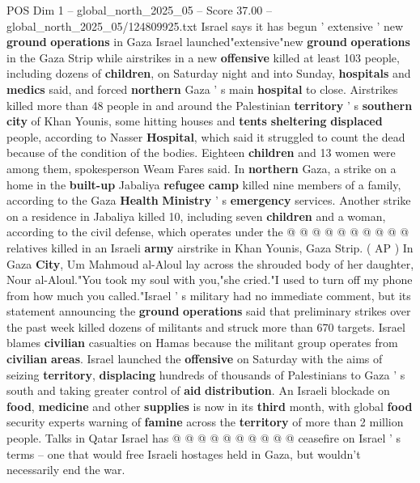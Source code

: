 \begin{textsample}{POS Dim 1 – global\_north\_2025\_05 – Score 37.00 – global\_north\_2025\_05/124809925.txt}  \label{ex:f1_pos_214}
Israel says it has begun ' extensive ' new \textbf{ground} \textbf{operations} in Gaza Israel launched"extensive"new \textbf{ground} \textbf{operations} in the Gaza Strip while airstrikes in a new \textbf{offensive} killed at least 103 people, including dozens of \textbf{children}, on Saturday night and into Sunday, \textbf{hospitals} and \textbf{medics} said, and forced \textbf{northern} Gaza ' s main \textbf{hospital} to close.
Airstrikes killed more than 48 people in and around the Palestinian \textbf{territory} ' s \textbf{southern} \textbf{city} of Khan Younis, some hitting houses and \textbf{tents} \textbf{sheltering} \textbf{displaced} people, according to Nasser \textbf{Hospital}, which said it struggled to count the dead because of the condition of the bodies.
Eighteen \textbf{children} and 13 women were among them, spokesperson Weam Fares said.
In \textbf{northern} Gaza, a strike on a home in the \textbf{built-up} Jabaliya \textbf{refugee} \textbf{camp} killed nine members of a family, according to the Gaza \textbf{Health} \textbf{Ministry} ' s \textbf{emergency} services.
Another strike on a residence in Jabaliya killed 10, including seven \textbf{children} and a woman, according to the civil defense, which operates under the @ @ @ @ @ @ @ @ @ @ relatives killed in an Israeli \textbf{army} airstrike in Khan Younis, Gaza Strip. ( AP ) In Gaza \textbf{City}, Um Mahmoud al-Aloul lay across the shrouded body of her daughter, Nour al-Aloul."You took my soul with you,"she cried."I used to turn off my phone from how much you called."Israel ' s military had no immediate comment, but its statement announcing the \textbf{ground} \textbf{operations} said that preliminary strikes over the past week killed dozens of militants and struck more than 670 targets.
Israel blames \textbf{civilian} casualties on Hamas because the militant group operates from \textbf{civilian} \textbf{areas}.
Israel launched the \textbf{offensive} on Saturday with the aims of seizing \textbf{territory}, \textbf{displacing} hundreds of thousands of Palestinians to Gaza ' s south and taking greater control of \textbf{aid} \textbf{distribution}.
An Israeli blockade on \textbf{food}, \textbf{medicine} and other \textbf{supplies} is now in its \textbf{third} month, with global \textbf{food} security experts warning of \textbf{famine} across the \textbf{territory} of more than 2 million people.
Talks in Qatar Israel has @ @ @ @ @ @ @ @ @ @ ceasefire on Israel ' s terms -- one that would free Israeli hostages held in Gaza, but wouldn't necessarily end the war.

\end{textsample}
